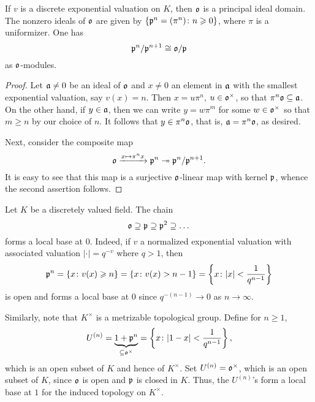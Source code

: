 \begin{proposition}
    If $v$ is a discrete exponential valuation on $K$, then $\mathfrak{o}$ is a principal ideal domain. The nonzero ideals of $\mathfrak{o}$ are given by $\{\mathfrak{p}^n = (\pi^n)\colon n\geqslant 0\}$, where $\pi$ is a uniformizer. One has 
    \begin{equation*}
        \mathfrak{p}^n/\mathfrak{p}^{n + 1}\cong\mathfrak{o}/\mathfrak{p}
    \end{equation*}
    as $\mathfrak{o}$-modules.
\end{proposition}
\begin{proof}
    Let $\mathfrak{a}\ne 0$ be an ideal of $\mathfrak{o}$ and $x\ne 0$ an element in $\mathfrak{a}$ with the smallest exponential valuation, say $v(x) = n$.  Then $x = u\pi^n$, $u\in\mathfrak{o}^\times$, so that $\pi^n\mathfrak{o}\subseteq\mathfrak{a}$. On the other hand, if $y\in\mathfrak{a}$, then we can write $y = w\pi^m$ for some $w\in\mathfrak{o}^\times$ so that $m\ge n$ by our choice of $n$. It follows that $y\in\pi^n\mathfrak{o}$, that is, $\mathfrak{a} = \pi^n\mathfrak{o}$, as desired. 

    Next, consider the composite map 
    \begin{equation*}
        \mathfrak{o}\xrightarrow{x\mapsto\pi^n x}\mathfrak{p}^n\twoheadrightarrow\mathfrak{p}^n/\mathfrak{p}^{n + 1}.
    \end{equation*}
    It is easy to see that this map is a surjective $\mathfrak{o}$-linear map with kernel $\mathfrak{p}$, whence the second assertion follows.
\end{proof}

\begin{remark}
    Let $K$ be a discretely valued field. The chain
    \begin{equation*}
        \mathfrak{o}\supseteq\mathfrak{p}\supseteq\mathfrak{p}^2\supseteq\dots
    \end{equation*}
    forms a local base at $0$. Indeed, if $v$ a normalized exponential valuation with associated valuation $|\cdot| = q^{-v}$ where $q > 1$, then 
    \begin{equation*}
        \mathfrak{p}^n = \left\{x\colon v(x)\geqslant n\right\} = \left\{x\colon v(x) > n - 1\right\} = \left\{x\colon |x| < \frac{1}{q^{n - 1}}\right\}
    \end{equation*}
    is open and forms a local base at $0$ since $q^{-(n - 1)}\to 0$ as $n\to\infty$.

    Similarly, note that $K^\times$ is a metrizable topological group. Define for $n\ge 1$, 
    \begin{equation*}
        U^{(n)} = \underbrace{1 + \mathfrak{p}^n}_{\subseteq\mathfrak{o}^\times} = \left\{x\colon |1 - x| < \frac{1}{q^{n - 1}}\right\},
    \end{equation*}
    which is an open subset of $K$ and hence of $K^\times$. Set $U^{(n)} = \mathfrak{o}^\times$, which is an open subset of $K$, since $\mathfrak{o}$ is open and $\mathfrak{p}$ is closed in $K$. Thus, the $U^{(n)}$'s form a local base at $1$ for the induced topology on $K^\times$.
\end{remark}

